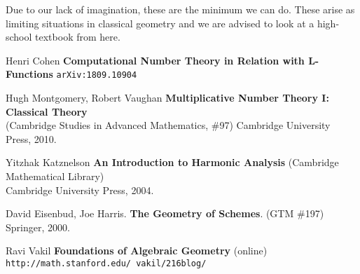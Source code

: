 \documentclass[12pt]{article}
\begin{document}
Due to our lack of imagination, these are the minimum we can do.  These arise as limiting situations in classical geometry and we are advised to look at a high-school textbook from here. 
\vfill
\begin{thebibliography}{} 

\item Henri Cohen \textbf{Computational Number Theory in Relation with L-Functions} \texttt{arXiv:1809.10904}

\item Hugh Montgomery, Robert Vaughan \textbf{Multiplicative Number Theory I: Classical Theory} \\ (Cambridge Studies in Advanced Mathematics, \#97) Cambridge University Press, 2010.

\item Yitzhak Katznelson \textbf{An Introduction to Harmonic Analysis} (Cambridge Mathematical Library) \\ Cambridge University Press, 2004.

\end{thebibliography}

\begin{thebibliography}{} 

\item David Eisenbud, Joe Harris.  \textbf{The Geometry of Schemes}. (GTM \#197) Springer, 2000.
\item Ravi Vakil \textbf{Foundations of Algebraic Geometry} (online) \texttt{http://math.stanford.edu/~vakil/216blog/}

\end{thebibliography}
\end{document}
